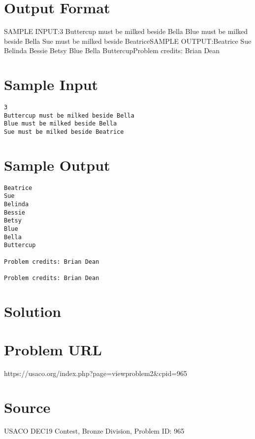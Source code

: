\documentclass[12pt]{article}
\begin{document}
\section*{Output Format}
SAMPLE INPUT:3
Buttercup must be milked beside Bella
Blue must be milked beside Bella
Sue must be milked beside BeatriceSAMPLE OUTPUT:Beatrice
Sue
Belinda
Bessie
Betsy
Blue
Bella
ButtercupProblem credits: Brian Dean

\section*{Sample Input}
\begin{verbatim}
3
Buttercup must be milked beside Bella
Blue must be milked beside Bella
Sue must be milked beside Beatrice
\end{verbatim}

\section*{Sample Output}
\begin{verbatim}
Beatrice
Sue
Belinda
Bessie
Betsy
Blue
Bella
Buttercup

Problem credits: Brian Dean

Problem credits: Brian Dean
\end{verbatim}

\section*{Solution}


\section*{Problem URL}
https://usaco.org/index.php?page=viewproblem2&cpid=965

\section*{Source}
USACO DEC19 Contest, Bronze Division, Problem ID: 965
\end{document}
